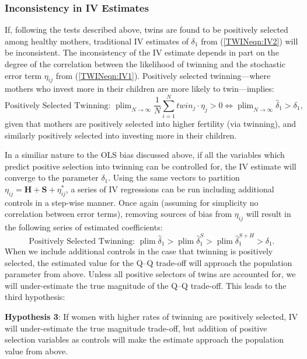 \documentclass[subeqn]{article}
\DeclareMathOperator{\plim}{plim}
\begin{document}
\begin{spacing}{1.4}
\subsubsection{Inconsistency in IV Estimates}
\label{sscn:inconsistentIV}
If, following the tests described above, twins are found to be positively selected
among healthy mothers, traditional IV estimates of $\delta_1$ from (\ref{TWINeqn:IV2})
will be inconsistent.  The inconsistency of the IV estimate depends in part on the
degree of the correlation between the likelihood of twinning and the stochastic error
term $\eta_{ij}$ from (\ref{TWINeqn:IV1}).  Positively selected twinning---where
mothers who invest more in their children are more likely to twin---implies:
\begin{equation}
  \text{Positively Selected Twinning:\ \ \ }  \plim_{N\rightarrow\infty} \frac{1}{N}\sum_{i=1}^Ntwin_j\cdot \eta_j > 0 \Leftrightarrow \plim_{N\rightarrow\infty}\hat\delta_1 > \delta_1, \nonumber
\end{equation}
given that mothers are positively selected into higher fertility (via twinning),
and similarly positively selected into investing more in their children.

In a similiar nature to the OLS bias discussed above, if all the variables
which predict positive selection into twinning can be controlled for, the
IV estimate will converge to the parameter $\delta_1$.  Using the same vectors
to partition $\eta_{ij}=\bm{H}+\bm{S}+\eta^*_{ij}$, a series of IV regressions
can be run including additional controls in a step-wise manner.  Once again
(assuming for simplicity no correlation between error terms), removing sources
of bias from $\eta_{ij}$ will result in the following series of estimated
coefficients:
\begin{equation}
  \text{Positively Selected Twinning:\ \ \ } \plim \hat\delta_1 > \plim\hat\delta_1^{S} > \plim\hat\delta_1^{S+H} > \delta_1. \nonumber
\end{equation}
When we include additional controls in the case that twinning is positively
selected, the estimated value for the Q--Q trade-off will approach the population
parameter from above.  Unless all positive selectors of twins are
accounted for, we will under-estimate the true magnitude of the Q--Q trade-off.
This leads to the third hypothesis:

\noindent \textbf{Hypothesis 3}: If women with higher rates of twinning are
positively selected, IV will under-estimate the true magnitude trade-off, but
addition of positive selection variables as controls will make the estimate
approach the population value from above.



\end{spacing}
\end{document}
